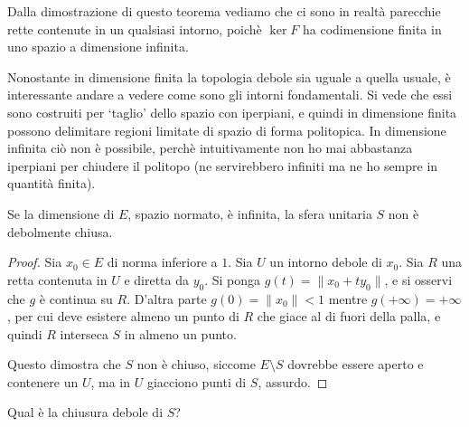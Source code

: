 \begin{remark}
	Dalla dimostrazione di questo teorema vediamo che ci sono in realtà parecchie rette contenute in un qualsiasi intorno, poichè $\ker F$ ha codimensione finita in uno spazio a dimensione infinita.
\end{remark}

Nonostante in dimensione finita la topologia debole sia uguale a quella usuale, è interessante andare a vedere come sono gli intorni fondamentali. Si vede che essi sono costruiti per `taglio' dello spazio con iperpiani, e quindi in dimensione finita possono delimitare regioni limitate di spazio di forma politopica. In dimensione infinita ciò non è possibile, perchè intuitivamente non ho mai abbastanza iperpiani per chiudere il politopo (ne servirebbero infiniti ma ne ho sempre in quantità finita).

\begin{corollary}
	Se la dimensione di $E$, spazio normato, è infinita, la sfera unitaria $S$ non è debolmente chiusa.
\end{corollary}
\begin{proof}
	Sia $x_0 \in E$ di norma inferiore a $1$. Sia $U$ un intorno debole di $x_0$. Sia $R$ una retta contenuta in $U$ e diretta da $y_0$. Si ponga $g(t) = \|x_0 + ty_0\|$, e si osservi che $g$ è continua su $R$. D'altra parte $g(0) = \|x_0\| < 1$ mentre $g(+\infty) = + \infty$, per cui deve esistere almeno un punto di $R$ che giace al di fuori della palla, e quindi $R$ interseca $S$ in almeno un punto.

	Questo dimostra che $S$ non è chiuso, siccome $E \setminus S$ dovrebbe essere aperto e contenere un $U$, ma in $U$ giacciono punti di $S$, assurdo.
\end{proof}

\begin{exercise}
	Qual è la chiusura debole di $S$?
\end{exercise}

